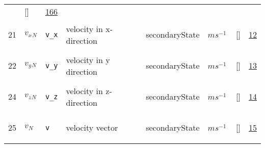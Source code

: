\begin{longtable}{|p{1cm}|p{3cm}|p{3cm}|p{7cm}|p{3.0cm}|p{3cm}|p{2cm}|p{1cm}|}
             & []
             & \hyperlink{"e:166"}{ 166 }
                 \\
    21
             & \hypertarget{"v:21"}{ $ {v_x}{_{N}} $}
             & \verb|v_x|
             & velocity in x-direction
             & \begin{lay}secondaryState \end{lay}
             & $ m s^{-1} \, $
             & []
             & \hyperlink{"e:12"}{ 12 }
                 \\
    22
             & \hypertarget{"v:22"}{ $ {v_y}{_{N}} $}
             & \verb|v_y|
             & velocity in y direction
             & \begin{lay}secondaryState \end{lay}
             & $ m s^{-1} \, $
             & []
             & \hyperlink{"e:13"}{ 13 }
                 \\
    24
             & \hypertarget{"v:24"}{ $ {v_z}{_{N}} $}
             & \verb|v_z|
             & velocity in z-direction
             & \begin{lay}secondaryState \end{lay}
             & $ m s^{-1} \, $
             & []
             & \hyperlink{"e:14"}{ 14 }
                 \\
    25
             & \hypertarget{"v:25"}{ $ {v}{_{N}} $}
             & \verb|v|
             & velocity vector
             & \begin{lay}secondaryState \end{lay}
             & $ m s^{-1} \, $
             & []
             & \hyperlink{"e:15"}{ 15 }
                 \\
    \end{longtable}